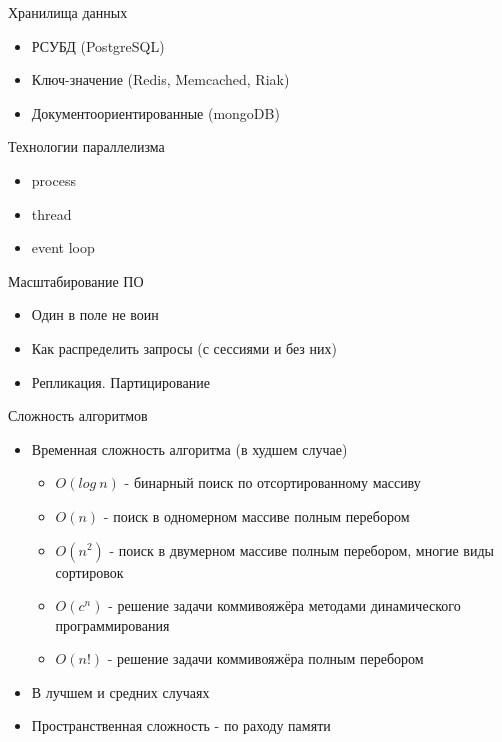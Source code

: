 \documentclass[aspectratio=169]{beamer}
\begin{document}
\begin{frame}{Хранилища данных}
\begin{itemize}
\item РСУБД (PostgreSQL)
\pause
\item Ключ-значение (Redis, Memcached, Riak)
\pause
\item Документоориентированные (mongoDB)
\end{itemize}
\end{frame}

\begin{frame}{Технологии параллелизма}
\begin{itemize}
\item process
\pause
\item thread
\pause
\item event loop
\end{itemize}
\end{frame}

\begin{frame}{Масштабирование ПО}
\begin{itemize}
\item Один в поле не воин
\pause
\item Как распределить запросы (с сессиями и без них)
\pause
\item Репликация. Партицирование
\end{itemize}
\end{frame}

\begin{frame}{Сложность алгоритмов}
\begin{itemize}
\item Временная сложность алгоритма (в худшем случае)
\begin{itemize}
\item $O(log \: n)$ - бинарный поиск по отсортированному массиву
\item $O(n)$ - поиск в одномерном массиве полным перебором
\item $O(n^2)$ - поиск в двумерном массиве полным перебором, многие виды сортировок
\item $O(c^n)$ - решение задачи коммивояжёра методами динамического программирования
\item $O(n!)$ - решение задачи коммивояжёра полным перебором
\end{itemize}
\pause
\item В лучшем и средних случаях
\pause
\item Пространственная сложность - по раходу памяти
\end{itemize}
\end{frame}
\end{document}
